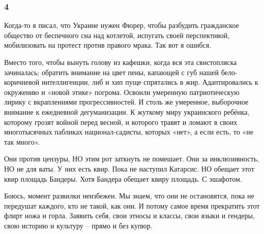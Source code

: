  
 
 
 
 

\subsubsection{4}
\label{sec:19_02_2022.fb.uljanov_anatolij.1.mne_nravitsja_kak_ih_korezhit.4}

Когда-то я писал, что Украине нужен Фюрер, чтобы разбудить гражданское общество
от беспечного сна над котлетой, испугать своей перспективой, мобилизовать на
протест против правого мрака. Так вот я ошибся. 

Вместо того, чтобы вынуть голову из кафешки, когда вся эта свистопляска
зачиналась; обратить внимание на цвет пены, капающей с губ нашей
бело-коричневой интеллигенции, либ и хип пуще спрятались в жир. Адаптировались
к окружению и «новой этике» погрома. Освоили умеренную патриотическую лирику с
вкраплениями прогрессивностей. И столь же умеренное, выборочное внимание к
ежедневной дегуманизации. К жуткому миру украинского ребёнка, которому грозят
войной перед весной, и которого травят и ломают в своих многотысячных пабликах
национал-садисты, которых «нет», а если есть, то «не так много».

Они против цензуры, НО этим рот заткнуть не помешает. Они за инклюзивность, НО
не для ваты. У них есть квир. Пока не наступил Катарсис. НО обещает этот квир
площадь Бандеры. Хотя Бандера обещает квиру площадь. С эшафотом.

Боюсь, момент развилки неизбежен. Мы знаем, что они не остановятся, пока не
передушат каждого, кто не такой, как они. И потому самое время прекратить этот
флирт ножа и горла. Заявить себя, свои этносы и классы, свои языки и гендеры,
свою историю и культуру – прямо и без купюр.
